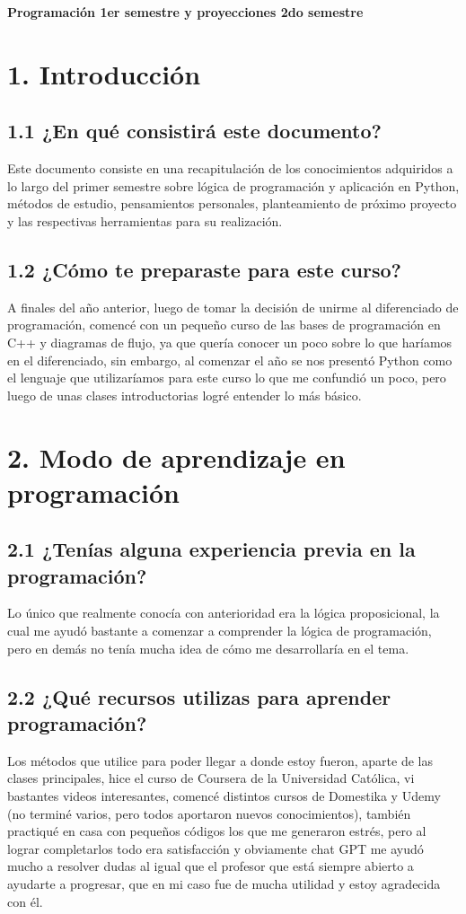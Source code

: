 \documentclass{article}
\begin{document}
\begin{center}
    \Large{\textbf{Programación 1er semestre y proyecciones 2do semestre}}
\end{center}

\section*{1. Introducción}

\subsection*{1.1 ¿En qué consistirá este documento?}
Este documento consiste en una recapitulación de los conocimientos adquiridos a lo largo del primer semestre sobre lógica de programación y aplicación en Python, métodos de estudio, pensamientos personales, planteamiento de próximo proyecto y las respectivas herramientas para su realización.

\subsection*{1.2 ¿Cómo te preparaste para este curso?}
A finales del año anterior, luego de tomar la decisión de unirme al diferenciado de programación, comencé con un pequeño curso de las bases de programación en C++ y diagramas de flujo, ya que quería conocer un poco sobre lo que haríamos en el diferenciado, sin embargo, al comenzar el año se nos presentó Python como el lenguaje que utilizaríamos para este curso lo que me confundió un poco, pero luego de unas clases introductorias logré entender lo más básico.

\section*{2. Modo de aprendizaje en programación}

\subsection*{2.1 ¿Tenías alguna experiencia previa en la programación?}
Lo único que realmente conocía con anterioridad era la lógica proposicional, la cual me ayudó bastante a comenzar a comprender la lógica de programación, pero en demás no tenía mucha idea de cómo me desarrollaría en el tema.

\subsection*{2.2 ¿Qué recursos utilizas para aprender programación?}
Los métodos que utilice para poder llegar a donde estoy fueron, aparte de las clases principales, hice el curso de Coursera de la Universidad Católica, vi bastantes videos interesantes, comencé distintos cursos de Domestika y Udemy (no terminé varios, pero todos aportaron nuevos conocimientos), también practiqué en casa con pequeños códigos los que me generaron estrés, pero al lograr completarlos todo era satisfacción y obviamente chat GPT me ayudó mucho a resolver dudas al igual que el profesor que está siempre abierto a ayudarte a progresar, que en mi caso fue de mucha utilidad y estoy agradecida con él.
\end{document}
